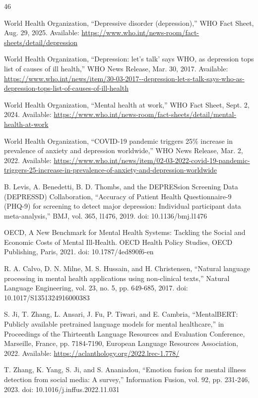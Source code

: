 \documentclass{ieeeaccess}
\begin{document}
\begin{thebibliography}{46}

 World Health Organization, ``Depressive disorder (depression),'' WHO Fact Sheet, Aug. 29, 2025. Available: \url{https://www.who.int/news-room/fact-sheets/detail/depression}

 World Health Organization, ``Depression: let's talk' says WHO, as depression tops list of causes of ill health,'' WHO News Release, Mar. 30, 2017. Available: \url{https://www.who.int/news/item/30-03-2017--depression-let-s-talk-says-who-as-depression-tops-list-of-causes-of-ill-health}

 World Health Organization, ``Mental health at work,'' WHO Fact Sheet, Sept. 2, 2024. Available: \url{https://www.who.int/news-room/fact-sheets/detail/mental-health-at-work}

 World Health Organization, ``COVID-19 pandemic triggers 25\% increase in prevalence of anxiety and depression worldwide,'' WHO News Release, Mar. 2, 2022. Available: \url{https://www.who.int/news/item/02-03-2022-covid-19-pandemic-triggers-25-increase-in-prevalence-of-anxiety-and-depression-worldwide}

 B. Levis, A. Benedetti, B. D. Thombs, and the DEPRESsion Screening Data (DEPRESSD) Collaboration, ``Accuracy of Patient Health Questionnaire-9 (PHQ-9) for screening to detect major depression: Individual participant data meta-analysis,'' BMJ, vol. 365, l1476, 2019. doi: 10.1136/bmj.l1476

 OECD, A New Benchmark for Mental Health Systems: Tackling the Social and Economic Costs of Mental Ill-Health. OECD Health Policy Studies, OECD Publishing, Paris, 2021. doi: 10.1787/4ed890f6-en

 R. A. Calvo, D. N. Milne, M. S. Hussain, and H. Christensen, ``Natural language processing in mental health applications using non-clinical texts,'' Natural Language Engineering, vol. 23, no. 5, pp. 649-685, 2017. doi: 10.1017/S1351324916000383

 S. Ji, T. Zhang, L. Ansari, J. Fu, P. Tiwari, and E. Cambria, ``MentalBERT: Publicly available pretrained language models for mental healthcare,'' in Proceedings of the Thirteenth Language Resources and Evaluation Conference, Marseille, France, pp. 7184-7190, European Language Resources Association, 2022. Available: \url{https://aclanthology.org/2022.lrec-1.778/}

 T. Zhang, K. Yang, S. Ji, and S. Ananiadou, ``Emotion fusion for mental illness detection from social media: A survey,'' Information Fusion, vol. 92, pp. 231-246, 2023. doi: 10.1016/j.inffus.2022.11.031


\end{thebibliography}
\end{document}
